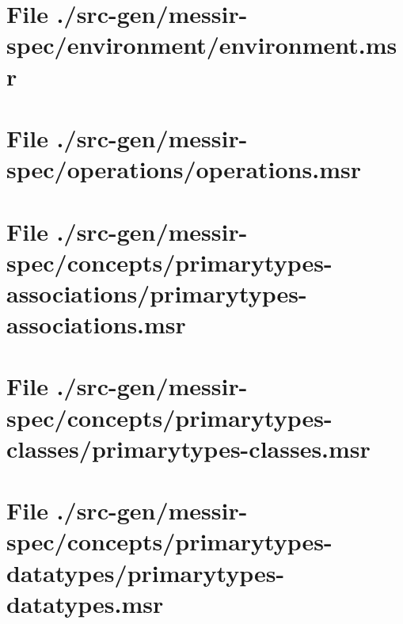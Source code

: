 \section[File /src-gen/messir-spec/environment/environment.msr]{File ./src-gen/messir-spec/environment/environment.msr}
\scriptsize

\normalsize
	
\section[File /src-gen/messir-spec/operations/operations.msr]{File ./src-gen/messir-spec/operations/operations.msr}
\scriptsize

\normalsize
	
\section[File /src-gen/messir-spec/concepts.../primarytypes-associations.msr]{File ./src-gen/messir-spec/concepts/primarytypes-associations/primarytypes-associations.msr}
\scriptsize

\normalsize
	
\section[File /src-gen/messir-spec/concepts/primarytypes-classes/primarytypes-classes.msr]{File ./src-gen/messir-spec/concepts/primarytypes-classes/primarytypes-classes.msr}
\scriptsize

\normalsize
	
\section[File /src-gen/messir-spec/concepts.../primarytypes-datatypes.msr]{File ./src-gen/messir-spec/concepts/primarytypes-datatypes/primarytypes-datatypes.msr}
\scriptsize

\normalsize
	

